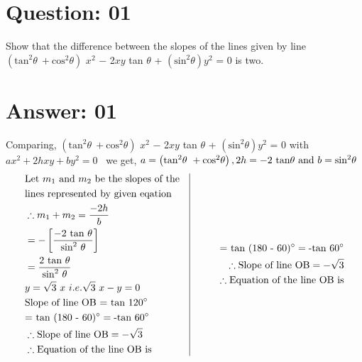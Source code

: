 \documentclass[17pt]{extarticle}
\begin{document}
\noindent
\begin{fleqn} 


\section{Question: 01}
Show that the difference between the slopes of the lines given by line $\left(\text{tan}^2\theta \ + \text{cos}^2\theta \right)$ $x^2$ $-$ 2$xy$ tan $\theta$ + $\left(\text{sin}^2\theta\right) y^2 $ = 0  is two.
 

\section{Answer: 01}
Comparing, $\left(\text{tan}^2\theta \ + \text{cos}^2\theta \right)$ $x^2$ $-$ 2$xy$ tan $\theta$ + $\left(\text{sin}^2\theta\right) y^2 $ = 0 with $ax^2 + 2hxy +  by^2 = 0 $  \ we get, $a = \left(\text{tan}^2\theta \ + \text{cos}^2\theta \right),\\ 2h = - 2\ \text {tan}\theta \  \text{and}\ b = \text{sin}^2\theta $
\begin{equation} \nonumber
\begin{alignedat}{4}
& \text {Let} \ m_1 \ \text{and}\ m_2\ \text {be the slopes of the}\\ 
& \text {lines represented by given eqation}  \\
& \therefore m_1 + m_2 = \frac{-2h}{b} \\ 
& = -\left[\frac{-2\ \text {tan}\ \theta }{\text {sin}^2\ \theta } \right] \\
& = \frac{2\ \text{tan}\ \theta}{\text {sin}^2\ \theta}\\  
& y= \sqrt{3}\ x \ i.e. \sqrt{3}\ x - y = 0 \\ 
& \text {Slope of line OB = tan 120\degree} \\
& \text {= tan (180 - 60)\degree} = \text{-tan}\ 60\degree\\
& \therefore \text {Slope of line OB} = -\sqrt{3} \\
& \therefore \text{Equation of the line OB is}\\  
\end{alignedat}
\quad
\vrule
\quad
\quad\quad
\begin{alignedat}{4}
\text {= tan (180 - 60)\degree} = \text{-tan}\ 60\degree\\
\therefore \text {Slope of line OB} = -\sqrt{3} \\
\therefore \text{Equation of the line OB is}\\  
\end{alignedat}
\end{equation}
\quad


\end{fleqn}
\end{document}

